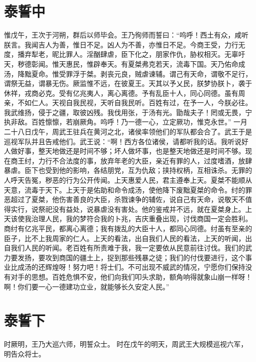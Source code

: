 \documentclass[12pt,UTF8]{ctexbook}
\begin{document}
\chapter{泰誓中}

惟戊午，王次于河朔，群后以师毕会。王乃徇师而誓曰：“呜呼！西土有众，咸听朕言。我闻吉人为善，惟日不足。凶人为不善，亦惟日不足。今商王受，力行无度，播弃犁老，昵比罪人。淫酗肆虐，臣下化之，朋家作仇，胁权相灭。无辜吁天，秽德彰闻。惟天惠民，惟辟奉天。有夏桀弗克若天，流毒下国。天乃佑命成汤，降黜夏命。惟受罪浮于桀。剥丧元良，贼虐谏辅。谓己有天命，谓敬不足行，谓祭无益，谓暴无伤。厥监惟不远，在彼夏王。天其以予乂民，朕梦协朕卜，袭于休祥，戎商必克。受有亿兆夷人，离心离德。予有乱臣十人，同心同德。虽有周亲，不如仁人。天视自我民视，天听自我民听。百姓有过，在予一人，今朕必往。我武维扬，侵于之疆，取彼凶残。我伐用张，于汤有光。勖哉夫子！罔或无畏，宁执非敌。百姓懔懔，若崩厥角。呜呼！乃一德一心，立定厥功，惟克永世。”
一月二十八日戊午，周武王驻兵在黄河之北，诸侯率领他们的军队都会合了。武王于是巡视军队并且告戒他们。武王说：“啊！西方各位诸侯，请都听我的话。我听说好人做好事，整天地做还是时间不够；坏人做坏事，也是整天地做还是时间不够。现在商王纣，力行不合法度的事，放弃年老的大臣，亲近有罪的人，过度嗜酒，放肆暴虐。臣下也受到他的影响，各结朋党，互为仇敌；挟持权柄，互相诛杀。无罪的人呼天告冤，秽恶的行为公开传闻。上天惠爱人民，君主遵奉上天。夏桀不能顺从天意，流毒于天下。上天于是佑助和命令成汤，使他降下废黜夏桀的命令。纣的罪恶超过了夏桀，他伤害善良的大臣，杀戮谏争的辅佐，说自己有天命，说敬天不值得实行，说祭祀没有益处，说暴虐没有害处。他的鉴戒并不远，就在夏桀身上。上天该使我治理人民，我的梦符合我的卜兆，吉庆重叠出现，讨伐商国一定会胜利。商纣有亿兆平民，都离心离德；我有拨乱的大臣十人，都同心同德。纣虽有至亲的臣子，比不上我周家的仁人。上天的看法，出自我们人民的看法，上天的听闻，出自我们人民的听闻。老百姓有所责难于我，我一定要依从民意前往讨伐。我们的武力要发扬，要攻到商国的疆土上，捉到那些残暴之徒；我们的付伐要进行，这个事业比成汤的还辉煌呀！努力吧！将士们。不可出现不威武的情况，宁愿你们保持没有对手的思想。百姓危惧不安，他们向我们叩头求助，额角响得就象山崩一样呀！啊！你们要一心一德建功立业，就能够长久安定人民。”

\chapter{泰誓下}

时厥明，王乃大巡六师，明誓众士。
时在戊午的明天，周武王大规模巡视六军，明告众将士。
\end{document}
